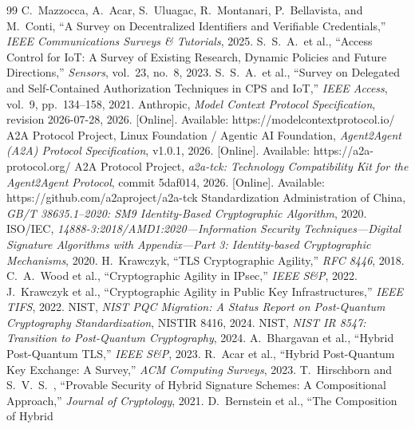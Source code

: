 \documentclass[10pt,twocolumn]{IEEEtran}
\begin{document}
\begin{appendices}
\begin{thebibliography}{99}
   C.~Mazzocca, A.~Acar, S.~Uluagac, R.~Montanari,
    P.~Bellavista, and M.~Conti, ``A Survey on Decentralized Identifiers and
    Verifiable Credentials,'' \emph{IEEE Communications Surveys \& Tutorials}, 2025.
   S.~S.~A.~et al., ``Access Control for IoT:
    A Survey of Existing Research, Dynamic Policies and Future Directions,''
    \emph{Sensors}, vol.~23, no.~8, 2023.
   S.~S.~A.~et al., ``Survey on Delegated and
    Self-Contained Authorization Techniques in CPS and IoT,'' \emph{IEEE Access},
    vol.~9, pp.~134--158, 2021.
 Anthropic, \emph{Model Context Protocol Specification},
    revision 2026-07-28, 2026. [Online]. Available: https://modelcontextprotocol.io/
   A2A Protocol Project, Linux Foundation / Agentic AI Foundation,
    \emph{Agent2Agent (A2A) Protocol Specification}, v1.0.1, 2026.
    [Online]. Available: https://a2a-protocol.org/
   A2A Protocol Project, \emph{a2a-tck: Technology Compatibility
    Kit for the Agent2Agent Protocol}, commit 5daf014, 2026. [Online].
    Available: https://github.com/a2aproject/a2a-tck
   Standardization Administration of China, \emph{GB/T 38635.1--2020:
    SM9 Identity-Based Cryptographic Algorithm}, 2020.
   ISO/IEC, \emph{14888-3:2018/AMD1:2020---Information Security
    Techniques---Digital Signature Algorithms with Appendix---Part 3: Identity-based
    Cryptographic Mechanisms}, 2020.
   H.~Krawczyk, ``TLS Cryptographic Agility,''
    \emph{RFC 8446}, 2018.
   C.~A.~Wood et al., ``Cryptographic Agility in IPsec,''
    \emph{IEEE S\&P}, 2022.
   J.~Krawczyk et al., ``Cryptographic Agility in Public Key
    Infrastructures,''
    \emph{IEEE TIFS}, 2022.
   NIST, \emph{NIST PQC Migration: A Status Report on Post-Quantum
    Cryptography Standardization}, NISTIR 8416, 2024.
   NIST, \emph{NIST IR 8547: Transition to Post-Quantum
    Cryptography}, 2024.
   A.~Bhargavan et al., ``Hybrid Post-Quantum TLS,''
    \emph{IEEE S\&P}, 2023.
   R.~Acar et al., ``Hybrid Post-Quantum Key Exchange: A Survey,''
    \emph{ACM Computing Surveys}, 2023.
   T.~Hirschborn and S.~V.~S.~, ``Provable Security of Hybrid
    Signature Schemes: A Compositional Approach,''
    \emph{Journal of Cryptology}, 2021.
   D.~Bernstein et al., ``The Composition of Hybrid

\end{thebibliography}
\end{appendices}
\end{document}
